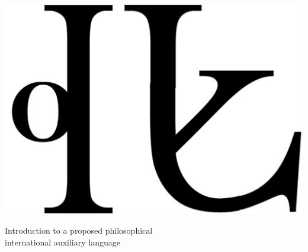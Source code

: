 \documentclass[12pt, a5]{article}
\begin{document}
\thispagestyle{empty}
\setcounter{page}{-1}
\begin{center}
\includegraphics[scale=0.6]{../Images/LogoAtlan.jpeg}

\end{center}
\begin{center}
        \hspace{0.7cm}

	
	\fontsize{12.7}{14.7}\selectfont \hspace{12.3pt}\font=3.3pt Introduction to a proposed philosophical\\ international auxiliary language
\end{center}
\end{document}
